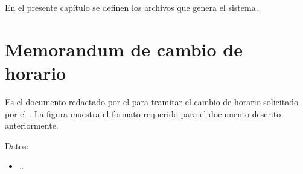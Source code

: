 \label{cap:documentos}

En el presente capítulo se definen los archivos que genera el sistema.



\begin{Documento}{\hypertarget{Documento: Memorandum Cambio de Horario}{\section{Memorandum de cambio de horario}}}{
	Es el documento redactado por el  para tramitar el cambio de horario solicitado por el . La figura  muestra el formato requerido para el documento descrito anteriormente.
	}
	\item[Datos:] \ISenter
    \begin{itemize}
		\item ...
    \end{itemize}
\end{Documento}

